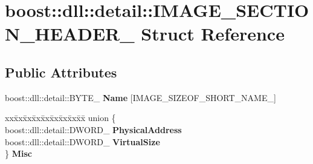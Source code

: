 \hypertarget{a01600}{}\section{boost\+:\+:dll\+:\+:detail\+:\+:I\+M\+A\+G\+E\+\_\+\+S\+E\+C\+T\+I\+O\+N\+\_\+\+H\+E\+A\+D\+E\+R\+\_\+ Struct Reference}
\label{a01600}
\subsection*{Public Attributes}
\begin{DoxyCompactItemize}
\item 
\mbox{\label{a01600_aec8a143be7ba929e96b578861cb831a9}} 
boost\+::dll\+::detail\+::\+B\+Y\+T\+E\+\_\+ {\bfseries Name} \mbox{[}I\+M\+A\+G\+E\+\_\+\+S\+I\+Z\+E\+O\+F\+\_\+\+S\+H\+O\+R\+T\+\_\+\+N\+A\+M\+E\+\_\+\mbox{]}
\item 
\mbox{\label{a01600_a57d9142484a367c9aad8bf27d038ba33}} 
\begin{tabbing}
xx\=xx\=xx\=xx\=xx\=xx\=xx\=xx\=xx\=\kill
union \{\\
\>boost::dll::detail::DWORD\_ {\bfseries PhysicalAddress}\\
\>boost::dll::detail::DWORD\_ {\bfseries VirtualSize}\\
\} {\bfseries Misc}\\


\end{tabbing}
\end{DoxyCompactItemize}
